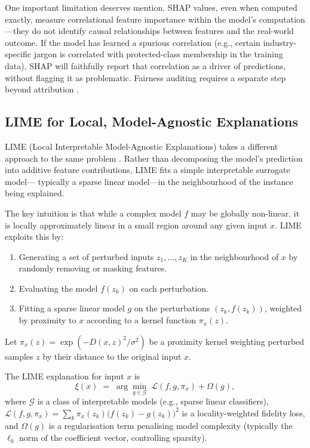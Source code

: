 One important limitation deserves mention. SHAP values, even when computed exactly,
measure correlational feature importance within the model's computation---they do not
identify causal relationships between features and the real-world outcome. If the model
has learned a spurious correlation (e.g., certain industry-specific jargon is correlated
with protected-class membership in the training data), SHAP will faithfully report that
correlation as a driver of predictions, without flagging it as problematic. Fairness
auditing requires a separate step beyond attribution \cite{mehrabi2021survey}.

\subsection{LIME for Local, Model-Agnostic Explanations}
\label{sec:ch12-lime}

LIME (Local Interpretable Model-Agnostic Explanations) takes a different approach to the
same problem \cite{ribeiro2016lime}. Rather than decomposing the model's prediction into
additive feature contributions, LIME fits a simple interpretable surrogate model---
typically a sparse linear model---in the neighbourhood of the instance being explained.

The key intuition is that while a complex model $f$ may be globally non-linear, it is
locally approximately linear in a small region around any given input $x$. LIME exploits
this by:
\begin{enumerate}
  \item Generating a set of perturbed inputs $z_1, \ldots, z_K$ in the neighbourhood of
        $x$ by randomly removing or masking features.
  \item Evaluating the model $f(z_k)$ on each perturbation.
  \item Fitting a sparse linear model $g$ on the perturbations $(z_k, f(z_k))$, weighted
        by proximity to $x$ according to a kernel function $\pi_x(z)$.
\end{enumerate}

Let $\pi_x(z) = \exp(-D(x,z)^2/\sigma^2)$ be a proximity kernel weighting perturbed samples $z$ by their distance to the original input $x$.

\begin{definition}
\label{def:lime-objective}
The LIME explanation for input $x$ is
\begin{equation}
\label{eq:lime-objective}
\xi(x) \;=\; \arg\min_{g \in \mathcal{G}} \;
\mathcal{L}(f, g, \pi_x) + \Omega(g),
\end{equation}
where $\mathcal{G}$ is a class of interpretable models (e.g., sparse linear classifiers),
$\mathcal{L}(f, g, \pi_x) = \sum_k \pi_x(z_k)\bigl(f(z_k) - g(z_k)\bigr)^2$ is a
locality-weighted fidelity loss, and $\Omega(g)$ is a regularisation term penalising
model complexity (typically the $\ell_0$ norm of the coefficient vector, controlling
sparsity).
\end{definition}

